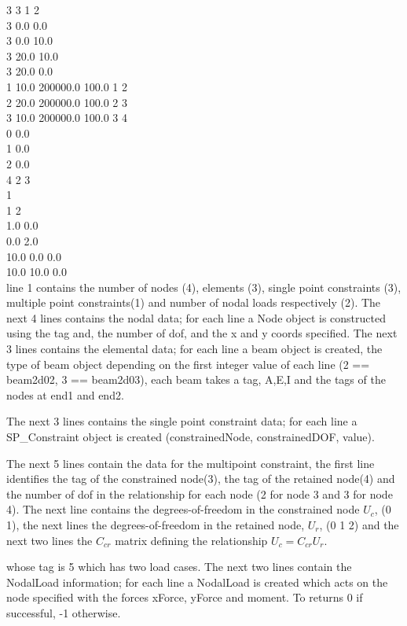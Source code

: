 \indent{} 3 3 1 2\\
\indent{} 3  0.0  0.0 \\
\indent{} 3  0.0 10.0 \\
\indent{} 3 20.0 10.0 \\
\indent{} 3 20.0  0.0 \\
\indent{} 1 10.0 200000.0 100.0 1 2 \\
\indent{} 2 20.0 200000.0 100.0 2 3 \\
\indent{} 3 10.0 200000.0 100.0 3 4 \\
\indent{} 0 0.0 \\
\indent{} 1 0.0 \\
\indent{} 2 0.0 \\
\indent{} 4 2 3 \\
\indent{} 1 \\
\indent{} 1 2 \\
\indent{} 1.0 0.0 \\
\indent{} 0.0 2.0 \\
\indent{} 10.0 0.0 0.0 \\
\indent{} 10.0 10.0 0.0 \\


\indent line 1 contains the number of nodes (4), elements (3), single
point constraints (3), multiple point constraints(1) and number of
nodal loads respectively (2). The next 4 lines contains the nodal
data; for each line a Node object is constructed using the tag and,
the number of dof, and the x and y coords specified. The next 3 lines
contains the elemental data; for each line a beam object is created,
the type of beam object depending on the first integer value of each
line (2 == beam2d02, 3 == beam2d03), each beam takes a tag, A,E,I and
the tags of the nodes at end1 and end2. 

The next 3 lines contains the single point
constraint data; for each line a SP\_Constraint object is created
(constrainedNode, constrainedDOF, value). 

The next 5 lines contain the data for the multipoint constraint, the
first line identifies the tag of the constrained node(3), the tag of
the retained node(4) and the number of dof in the relationship for
each node (2 for node 3 and 3 for node 4). The next line contains the
degrees-of-freedom in the constrained node $U_c$, (0 1), the next lines the
degrees-of-freedom in the retained node, $U_r$, (0 1 2) and the next
two lines the $C_{cr}$ matrix defining the relationship $U_c = C_{cr} U_r$.

whose tag is 5 which has two load cases. The next two lines contain
the NodalLoad information; for each line a NodalLoad is created which
acts on the node specified with the forces xForce, yForce and
moment. To returns 0 if successful, -1 otherwise. \\





